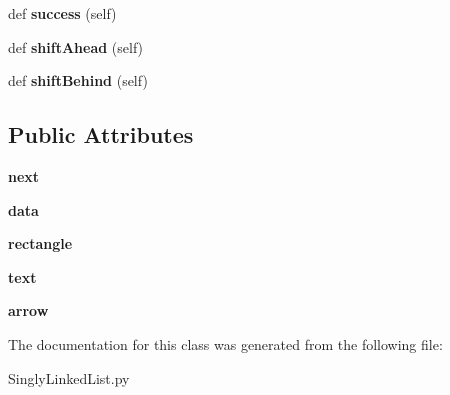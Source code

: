 \begin{DoxyCompactItemize}
def {\bfseries success} (self)
\item 
\mbox{\label{class_singly_linked_list_1_1_singly_linked_list_node_aabccf02e114b5abb5fd40a7cc7ab240b}} 
def {\bfseries shift\+Ahead} (self)
\item 
\mbox{\label{class_singly_linked_list_1_1_singly_linked_list_node_ab7d981efc16e32b20f6653aa579f3f3b}} 
def {\bfseries shift\+Behind} (self)
\end{DoxyCompactItemize}
\subsection*{Public Attributes}
\begin{DoxyCompactItemize}
\item 
\mbox{\label{class_singly_linked_list_1_1_singly_linked_list_node_a4dafb60af09bd5be70622ab7e9eeb743}} 
{\bfseries next}
\item 
\mbox{\label{class_singly_linked_list_1_1_singly_linked_list_node_a4ecec4767ec2df1e1985683f8986bdf2}} 
{\bfseries data}
\item 
\mbox{\label{class_singly_linked_list_1_1_singly_linked_list_node_a90f38d27b040c3c09460bbfbac48463e}} 
{\bfseries rectangle}
\item 
\mbox{\label{class_singly_linked_list_1_1_singly_linked_list_node_a322a731f88a73f394b4b775eac6acef6}} 
{\bfseries text}
\item 
\mbox{\label{class_singly_linked_list_1_1_singly_linked_list_node_afc27fef68ee2fd5b4a25b8ff4368e12c}} 
{\bfseries arrow}
\end{DoxyCompactItemize}


The documentation for this class was generated from the following file\+:\begin{DoxyCompactItemize}
\item 
Singly\+Linked\+List.\+py\end{DoxyCompactItemize}
